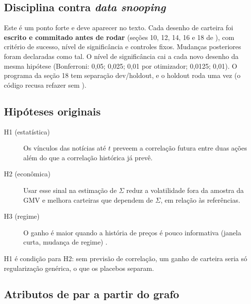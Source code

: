 \documentclass[11pt,a4paper]{article}
\begin{document}
\subsection{Disciplina contra \emph{data snooping}}

Este é um ponto forte e deve aparecer no texto. Cada desenho de carteira foi \textbf{escrito e
commitado antes de rodar} (seções 10, 12, 14, 16 e 18 de ), com
critério de sucesso, nível de significância e controles fixos. Mudanças posteriores foram
declaradas como tal. O nível de significância cai a cada novo desenho da mesma hipótese (Bonferroni:
0,05; 0,025; 0,01 por otimizador; 0,0125; 0,01). O programa da seção 18 tem separação dev/holdout, e
o holdout roda uma vez (o código recusa refazer sem ).

\subsection{Hipóteses originais}\label{sec:hipoteses}

\begin{description}
  \item[H1 (estatística)] Os vínculos das notícias até $t$ preveem a correlação futura entre duas
        ações além do que a correlação histórica já prevê.
  \item[H2 (econômica)] Usar esse sinal na estimação de $\Sigma$ reduz a volatilidade fora da amostra
        da GMV e melhora carteiras que dependem de $\Sigma$, em relação às referências.
  \item[H3 (regime)] O ganho é maior quando a história de preços é pouco informativa (janela curta,
        mudança de regime) \citep{becquin2023}.
\end{description}
H1 é condição para H2: sem previsão de correlação, um ganho de carteira seria só regularização
genérica, o que os placebos separam.

\subsection{Atributos de par a partir do grafo}
\end{document}
